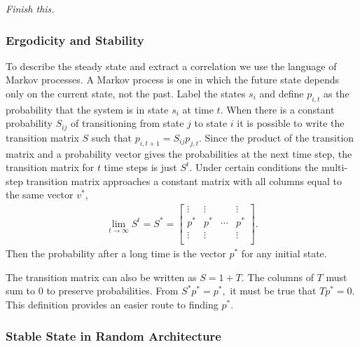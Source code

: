 \emph{Finish this.}

\subsubsection{Ergodicity and Stability} \label{subsub:ergstab}

To describe the steady state and extract a correlation we use the language of Markov processes. A Markov process is one in which the future state depends only on the current state, not the past. Label the states $s_i$ and define $p_{i,t}$ as the probability that the system is in state $s_i$ at time $t$. When there is a constant probability $S_{ij}$ of transitioning from state $j$ to state $i$ it is possible to write the transition matrix $S$ such that $p_{i,t+1}= S_{ij}p_{j,t}$. Since the product of the transition matrix and a probability vector gives the probabilities at the next time step, the transition matrix for $t$ time steps is just $S^t$. Under certain conditions the multi-step transition matrix approaches a constant matrix with all columns equal to the same vector $v^*$,
\begin{align}
\lim\limits_{t\to \infty}S^t = S^* = \begin{bmatrix}
\vdots & \vdots &  & \vdots\\
p^* & p^* & \cdots & p^*\\
\vdots & \vdots &  & \vdots\\
\end{bmatrix}.
\end{align}
Then the probability after a long time is the vector $p^*$ for any initial state.

The transition matrix can also be written as $S = 1+T$. The columns of $T$ must sum to 0 to preserve probabilities. From $S^*p^* = p^*,$ it must be true that $Tp^*=0$. This definition provides an easier route to finding $p^*$.

\subsubsection{Stable State in Random Architecture}  \label{subsub:randstate}

